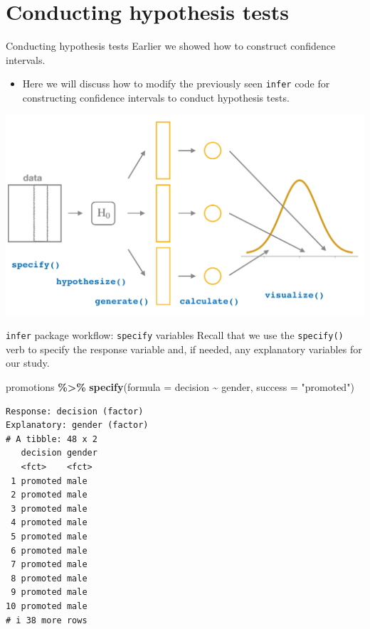 \documentclass[
  ignorenonframetext,
]{beamer}
\newenvironment{Shaded}{\begin{snugshade}}{\end{snugshade}}
\newcommand{\AttributeTok}[1]{\textcolor[rgb]{0.13,0.29,0.53}{#1}}
\newcommand{\FunctionTok}[1]{\textcolor[rgb]{0.13,0.29,0.53}{\textbf{#1}}}
\newcommand{\NormalTok}[1]{#1}
\newcommand{\SpecialCharTok}[1]{\textcolor[rgb]{0.81,0.36,0.00}{\textbf{#1}}}
\newcommand{\StringTok}[1]{\textcolor[rgb]{0.31,0.60,0.02}{#1}}
\providecommand{\tightlist}{%
  \setlength{\itemsep}{0pt}\setlength{\parskip}{0pt}}
\begin{document}
\hypertarget{conducting-hypothesis-tests}{%
\section{Conducting hypothesis
tests}\label{conducting-hypothesis-tests}}

\begin{frame}[fragile]{Conducting hypothesis tests}
\protect\hypertarget{conducting-hypothesis-tests-1}{}
Earlier we showed how to construct confidence intervals.

\begin{itemize}
\tightlist
\item
  Here we will discuss how to modify the previously seen \texttt{infer}
  code for constructing confidence intervals to conduct hypothesis
  tests.
\end{itemize}

\begin{center}\includegraphics[width=0.7\linewidth,height=0.5\textheight]{week12_7} \end{center}
\end{frame}

\begin{frame}[fragile]{\texttt{infer} package workflow: \texttt{specify}
variables}
\protect\hypertarget{infer-package-workflow-specify-variables}{}
Recall that we use the \texttt{specify()} verb to specify the response
variable and, if needed, any explanatory variables for our study.

\tiny

\begin{Shaded}
\begin{Highlighting}[]
\NormalTok{promotions }\SpecialCharTok{\%\textgreater{}\%} 
  \FunctionTok{specify}\NormalTok{(}\AttributeTok{formula =}\NormalTok{ decision }\SpecialCharTok{\textasciitilde{}}\NormalTok{ gender, }\AttributeTok{success =} \StringTok{"promoted"}\NormalTok{)}
\end{Highlighting}
\end{Shaded}

\begin{verbatim}
Response: decision (factor)
Explanatory: gender (factor)
# A tibble: 48 x 2
   decision gender
   <fct>    <fct> 
 1 promoted male  
 2 promoted male  
 3 promoted male  
 4 promoted male  
 5 promoted male  
 6 promoted male  
 7 promoted male  
 8 promoted male  
 9 promoted male  
10 promoted male  
# i 38 more rows
\end{verbatim}

\normalsize
\end{frame}
\end{document}
